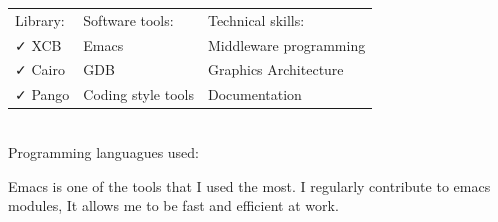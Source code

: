 \documentclass[letterpaper]{jm-cv} %
\begin{document}
\begin{tabular}{ l l l }
  Library: & \hspace{1cm}Software tools: & \hspace{1cm}Technical skills:\\
  {\color{mainblue}\faCheck} XCB &
  \hspace{1cm}{\color{maingreen}\faCheck} Emacs &
  \hspace{1cm}{\color{maingray}\faCheck} Middleware programming\\

  {\color{mainblue}\faCheck} Cairo &
  \hspace{1cm}{\color{maingreen}\faCheck} GDB &
  \hspace{1cm}{\color{maingray}\faCheck} Graphics Architecture\\

  {\color{mainblue}\faCheck} Pango &
  \hspace{1cm}{\color{maingreen}\faCheck} Coding style tools &
  \hspace{1cm}{\color{maingray}\faCheck} Documentation\\

\end{tabular}\\

Programming languagues used:\\

\divider

{\large{\color{maingray}\bullet}}

Emacs is one of the tools that I used the most.
I regularly contribute to emacs modules, It allows me to be fast and efficient at work.
\end{document}
